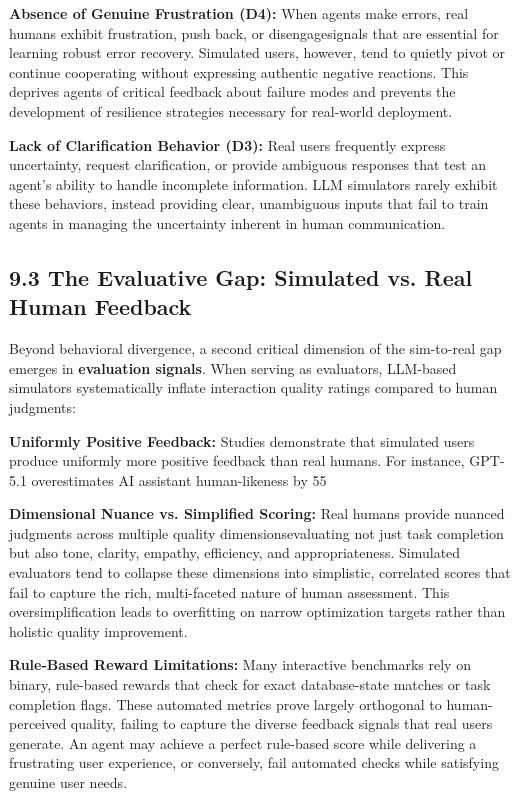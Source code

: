 \textbf{Absence of Genuine Frustration (D4):} When agents make errors, real humans exhibit frustration, push back, or disengagesignals that are essential for learning robust error recovery. Simulated users, however, tend to quietly pivot or continue cooperating without expressing authentic negative reactions. This deprives agents of critical feedback about failure modes and prevents the development of resilience strategies necessary for real-world deployment.

\textbf{Lack of Clarification Behavior (D3):} Real users frequently express uncertainty, request clarification, or provide ambiguous responses that test an agent's ability to handle incomplete information. LLM simulators rarely exhibit these behaviors, instead providing clear, unambiguous inputs that fail to train agents in managing the uncertainty inherent in human communication.

\subsection{9.3 The Evaluative Gap: Simulated vs. Real Human Feedback}

Beyond behavioral divergence, a second critical dimension of the sim-to-real gap emerges in \textbf{evaluation signals}. When serving as evaluators, LLM-based simulators systematically inflate interaction quality ratings compared to human judgments:

\textbf{Uniformly Positive Feedback:} Studies demonstrate that simulated users produce uniformly more positive feedback than real humans. For instance, GPT-5.1 overestimates AI assistant human-likeness by 55%

\textbf{Dimensional Nuance vs. Simplified Scoring:} Real humans provide nuanced judgments across multiple quality dimensionsevaluating not just task completion but also tone, clarity, empathy, efficiency, and appropriateness. Simulated evaluators tend to collapse these dimensions into simplistic, correlated scores that fail to capture the rich, multi-faceted nature of human assessment. This oversimplification leads to overfitting on narrow optimization targets rather than holistic quality improvement.

\textbf{Rule-Based Reward Limitations:} Many interactive benchmarks rely on binary, rule-based rewards that check for exact database-state matches or task completion flags. These automated metrics prove largely orthogonal to human-perceived quality, failing to capture the diverse feedback signals that real users generate. An agent may achieve a perfect rule-based score while delivering a frustrating user experience, or conversely, fail automated checks while satisfying genuine user needs.

